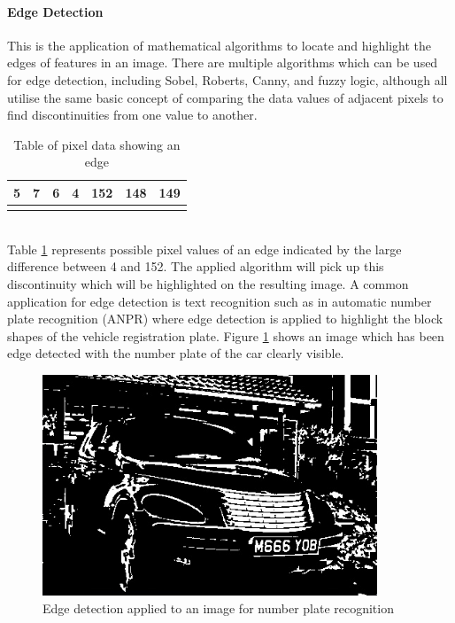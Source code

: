 	\paragraph{Edge Detection}
		This is the application of mathematical algorithms to locate and highlight the edges of features in an image. There are multiple algorithms which can be used for edge detection, including Sobel, Roberts, Canny, and fuzzy logic, although all utilise the same basic concept of comparing the data values of adjacent pixels to find discontinuities from one value to another.
		\begin{table}[h!]
			\centering
			\caption{Table of pixel data showing an edge}
			\label{tab:edgePixels}
			\begin{tabular}{|c|c|c|c|c|c|c|}
				\hline
				5&7&6&4&152&148&149\\
				\hline
				\cellcolor[HTML]{0D0D0D}&
				\cellcolor[HTML]{121212}&
				\cellcolor[HTML]{0F0F0F}&
				\cellcolor[HTML]{0a0a0a}&
				\cellcolor[HTML]{989898}&
				\cellcolor[HTML]{949494}&
				\cellcolor[HTML]{959595}\\
				\hline
			\end{tabular}
		\end{table}\\
		Table \ref{tab:edgePixels} represents possible pixel values of an edge indicated by the large difference between 4 and 152. The applied algorithm will pick up this discontinuity which will be highlighted on the resulting image. A common application for edge detection is text recognition such as in automatic number plate recognition (ANPR) \citep{anpr} where edge detection is applied to highlight the block shapes of the vehicle registration plate. Figure \ref{fig:anpr} shows an image which has been edge detected with the number plate of the car clearly visible.
		\begin{figure}[h!]
			\centering
			\includegraphics[width=10cm]{../images/anpr.jpg}
			\caption{Edge detection applied to an image for number plate recognition}
			\label{fig:anpr}
		\end{figure} 
